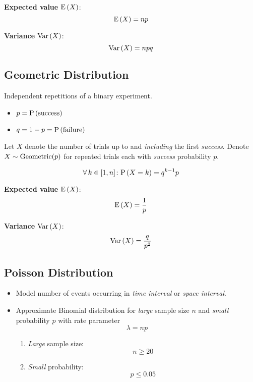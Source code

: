 \textbf{Expected value} $\mathrm{E} \left( X \right)$:
\begin{equation*}
    \mathrm{E} \left( X \right) = np
\end{equation*}

\textbf{Variance} $\mathrm{Var} \left( X \right)$:
\begin{equation*}
    \mathrm{Var} \left( X \right) = npq
\end{equation*}

\subsection*{Geometric Distribution}

Independent repetitions of a binary experiment.
\begin{itemize}
    \item $p = \mathrm{P} \left( \text{success} \right)$
    \item $q = 1 - p = \mathrm{P} \left( \text{failure} \right)$
\end{itemize}

Let $X$ denote the number of trials up to and \textit{including} the first \textit{success}. Denote $X \sim \mathrm{Geometric}(p)$ for repeated trials each with \textit{success} probability $p$.

\begin{equation*}
    \operatorname{\forall} k \in [1, n] \colon
    \mathrm{P} \left( X = k \right) = q^{k - 1} p
\end{equation*}

\textbf{Expected value} $\mathrm{E} \left( X \right)$:
\begin{equation*}
    \mathrm{E} \left( X \right) = \frac{1}{p}
\end{equation*}

\textbf{Variance} $\mathrm{Var} \left( X \right)$:
\begin{equation*}
    \mathrm{Var} \left( X \right) = \frac{q}{p^2}
\end{equation*}

\subsection*{Poisson Distribution}

\begin{itemize}
    \item Model number of events occurring in \textit{time interval} or \textit{space interval}.
    \item Approximate Binomial distribution for \textit{large} sample size $n$ and \textit{small} probability $p$ with rate parameter
    \begin{equation*}
        \lambda = np
    \end{equation*}
    \begin{enumerate}
        \item \textit{Large} sample size:
        \begin{equation*}
            n \ge 20
        \end{equation*}
        \item \textit{Small} probability:
        \begin{equation*}
            p \le 0.05
        \end{equation*}
    \end{enumerate}
\end{itemize}

